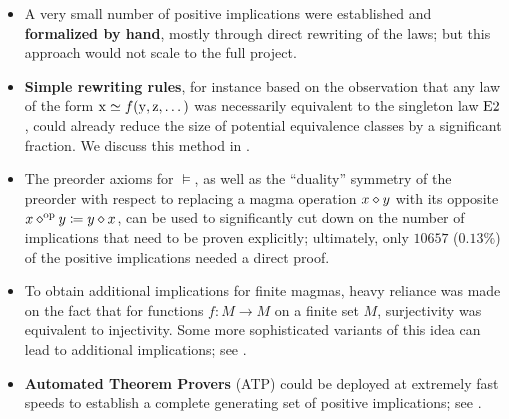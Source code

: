 \begin{itemize}
    \item A very small number of positive implications were established and \textbf{formalized by hand}, mostly through direct rewriting of the laws; but this approach would not scale to the full project.
    \item \textbf{Simple rewriting rules}, for instance based on the observation that any law of the form $\mathrm{x} \simeq f(\mathrm{y},\mathrm{z},\dots)$ was necessarily equivalent to the singleton law $\mathrm{E}2$, could already reduce the size of potential equivalence classes by a significant fraction. We discuss this method in .
    \item The preorder axioms for $\models$, as well as the ``duality'' symmetry of the preorder with respect to replacing a magma operation $x \diamond y$ with its opposite $x \diamond^{\mathrm{op}} y \coloneqq y \diamond x$, can be used to significantly cut down on the number of implications that need to be proven explicitly; ultimately, only $\num{10657}$ ($0.13\%$) of the positive implications needed a direct proof.
    \item To obtain additional implications for finite magmas, heavy reliance was made on the fact that for functions $f \colon M \to M$ on a finite set $M$, surjectivity was equivalent to injectivity.  Some more sophisticated variants of this idea can lead to additional implications; see .
    \item \textbf{Automated Theorem Provers} (ATP) could be deployed at extremely fast speeds to establish a complete generating set of positive implications; see .
\end{itemize}

